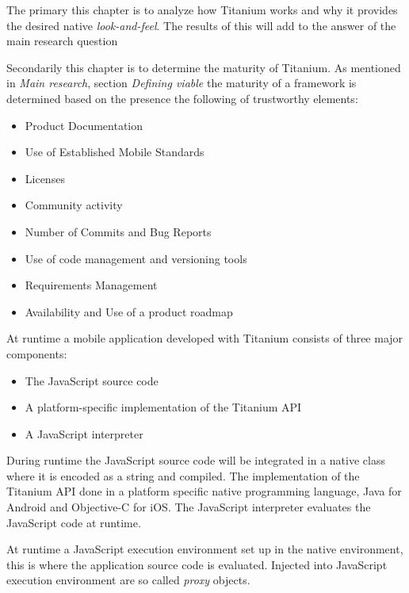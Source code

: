 


\noindent The primary this chapter is to analyze how Titanium works and why it provides the desired native \emph{look-and-feel}. The results of this will add to the answer of the main research question

Secondarily this chapter is to determine the maturity of Titanium. As mentioned in \emph{Main research}, section \emph{Defining viable} the maturity of a framework is determined based on the presence the following of trustworthy elements:

\begin{itemize}
  \setlength{\itemsep}{1pt}
  \setlength{\parskip}{0pt}
  \setlength{\parsep}{0pt}
\item Product Documentation
\item Use of Established Mobile Standards
\item Licenses
\item Community activity
\item Number of Commits and Bug Reports
\item Use of code management and versioning tools
\item Requirements Management
\item Availability and Use of a product roadmap
\end{itemize}



At runtime a mobile application developed with Titanium consists of three major components:
\begin{itemize}
	\item
	The JavaScript source code
	\item
	A platform-specific implementation of the Titanium API
	\item
	A JavaScript interpreter
\end{itemize}

During runtime the JavaScript source code will be integrated in a native class where it is encoded as a string and compiled. The implementation of the Titanium API done in a platform specific native programming language, Java for Android and Objective-C for iOS. The JavaScript interpreter evaluates the JavaScript code at runtime.


At runtime a JavaScript execution environment set up in the native environment, this is where the application source code is evaluated. Injected into JavaScript execution environment are so called \emph{proxy} objects.

